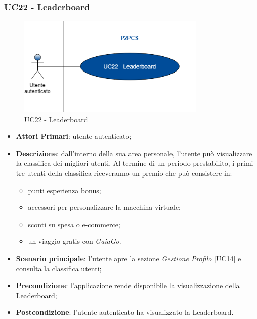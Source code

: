 \subsubsection{UC22 - Leaderboard}
\begin{figure}[h]
	\includegraphics[width=9cm]{res/images/UC22Leaderboard.png}
	\centering
	\caption{UC22 - Leaderboard}
\end{figure}
\begin{itemize}
	\item \textbf{Attori Primari}: utente autenticato;
	\item \textbf{Descrizione}: dall'interno della sua area personale, l'utente può visualizzare la classifica dei migliori utenti. Al termine di un periodo prestabilito, i primi tre utenti della classifica riceveranno un premio che può consistere in:
	\begin{itemize}
		\item punti esperienza bonus;
		\item accessori per personalizzare la macchina virtuale;
		\item sconti su spesa o e-commerce;
		\item un viaggio gratis con \textit{GaiaGo}.
	\end{itemize}
	\item \textbf{Scenario principale}: l'utente apre la sezione \textit{Gestione Profilo} [UC14] e consulta la classifica utenti;
	\item \textbf{Precondizione}: l'applicazione rende disponibile la visualizzazione della Leaderboard\glo;
	\item \textbf{Postcondizione}: l'utente autenticato ha visualizzato la Leaderboard.
\end{itemize}

